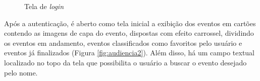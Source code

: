 \begin{figure}[H]
    \centering
    \caption{Tela de \textit{login}}
    \label{fig:audiencia1}
\end{figure}

Após a autenticação, é aberto como tela inicial a exibição dos eventos em cartões contendo as imagens de capa do evento, dispostas com efeito carrossel, dividindo os eventos em andamento, eventos classificados como favoritos pelo usuário e eventos já finalizados (Figura \ref{fig:audiencia2}). Além disso, há um campo textual localizado no topo da tela que possibilita o usuário a buscar o evento desejado pelo nome.

